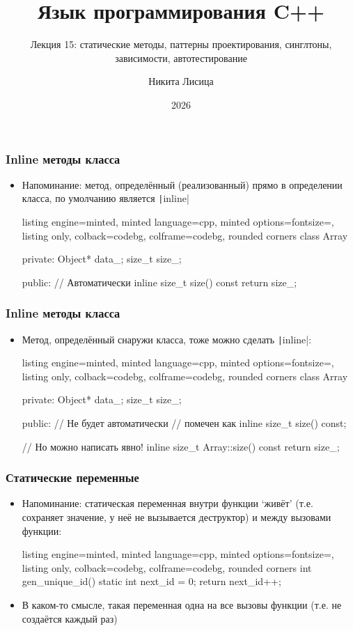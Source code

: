 \documentclass[10pt]{beamer}
\title{Язык программирования C++}
\subtitle{Лекция 15: статические методы, паттерны проектирования, синглтоны, зависимости, автотестирование}
\date{2026}
\author{Никита Лисица}
\begin{document}
\frame{\titlepage}

\begin{frame}[fragile]
\frametitle{Inline методы класса}
\begin{itemize}
\item Напоминание: метод, определённый (реализованный) прямо в определении класса, по умолчанию является \texttt|inline|
\begin{tcblisting}{listing engine=minted, minted language=cpp, minted options={fontsize=\scriptsize}, listing only, colback=codebg, colframe=codebg, rounded corners}
class Array {
private:
  Object* data_;
  size_t size_;

public:
  // Автоматически inline
  size_t size() const {
    return size_;
  }
}
\end{tcblisting}
\end{itemize}
\end{frame}

\begin{frame}[fragile]
\frametitle{Inline методы класса}
\begin{itemize}
\item Метод, определённый снаружи класса, тоже можно сделать \texttt|inline|:
\begin{tcblisting}{listing engine=minted, minted language=cpp, minted options={fontsize=\scriptsize}, listing only, colback=codebg, colframe=codebg, rounded corners}
class Array {
private:
  Object* data_;
  size_t size_;

public:
  // Не будет автоматически
  // помечен как inline
  size_t size() const;
}

// Но можно написать явно!
inline size_t Array::size() const {
  return size_;
}
\end{tcblisting}
\end{itemize}
\end{frame}

\begin{frame}[fragile]
\frametitle{Статические переменные}
\begin{itemize}
\item Напоминание: статическая переменная внутри функции `живёт' (т.е. сохраняет значение, у неё не вызывается деструктор) и между вызовами функции:
\begin{tcblisting}{listing engine=minted, minted language=cpp, minted options={fontsize=\scriptsize}, listing only, colback=codebg, colframe=codebg, rounded corners}
int gen_unique_id() {
  static int next_id = 0;
  return next_id++;
}
\end{tcblisting}
\pause
\item В каком-то смысле, такая переменная одна на все вызовы функции (т.е. не создаётся каждый раз)
\end{itemize}
\end{frame}
\end{document}
